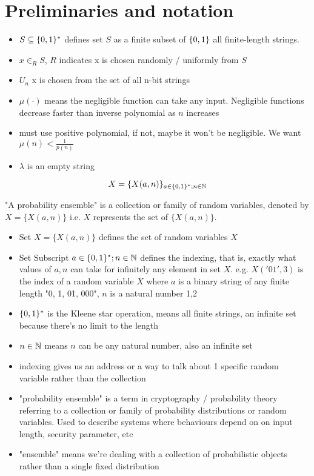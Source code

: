\section*{Preliminaries and notation}
\begin{itemize}
    \item $S \subseteq \{0,1\}^*$ defines set $S$ as a finite subset of $\{0,1\}$ all finite-length strings. 
    \item $x \in_R S$, $R$ indicates x is chosen randomly / uniformly from $S$
    \item $U_n$ x is chosen from the set of all n-bit strings
    \item $\mu(\cdot)$ means the negligible function can take any input. Negligible functions decrease faster than inverse polynomial as $n$ increases
    \item must use positive polynomial, if not, maybe it won't be negligible. We want $\mu(n) < \frac{1}{p(n)}$
    \item $\lambda$ is an empty string
\end{itemize}


$$
X = \{X(a,n)\}_{a\in\{0,1\}^*; n \in \mathbb{N}}
$$

"A probability ensemble" is a collection or family of random variables, denoted by $X = \{X(a,n)\}$ i.e. $X$ represents the set of $\{X(a,n)\}$. 
\begin{itemize}
    \item Set $X = \{X(a,n)\}$ defines the set of random variables $X$
    \item Set Subscript ${a\in\{0,1\}^*; n \in \mathbb{N}}$ defines the indexing, that is, exactly what values of $a, n$ can take for infinitely any element in set $X$. e.g. $X('01', 3)$ is the index of a random variable $X$ where $a$ is a binary string of any finite length "0, 1, 01, 000", $n$ is a natural number 1,2
    \item $\{0,1\}^*$ is the Kleene star operation, means all finite strings, an infinite set because there's no limit to the length
    \item $n\in\mathbb{N}$ means $n$ can be any natural number, also an infinite set
    \item indexing gives us an address or a way to talk about 1 specific random variable rather than the collection
    \item "probability ensemble" is a term in cryptography / probability theory referring to a collection or family of probability distributions or random variables. Used to describe systems where behaviours depend on on input length, security parameter, etc
    \item "ensemble" means we're dealing with a collection of probabilistic objects rather than a single fixed distribution
\end{itemize}

